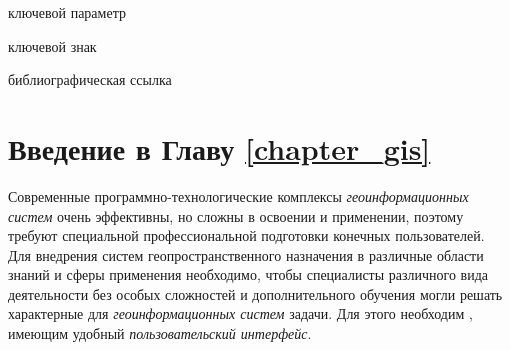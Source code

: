 \begin{SCn}
\begin{scnrelfromlist}{ключевой параметр}
\end{scnrelfromlist}

\begin{scnrelfromlist}{ключевой знак}
\end{scnrelfromlist}

\begin{scnrelfromlist}{библиографическая ссылка}
\end{scnrelfromlist}
\end{SCn}

\section*{Введение в Главу \ref{chapter_gis}}

Современные программно-технологические комплексы \textit{геоинформационных систем} очень эффективны, но сложны в освоении и применении, поэтому требуют специальной профессиональной подготовки конечных пользователей. Для внедрения систем геопространственного назначения в различные области знаний и сферы применения необходимо, чтобы специалисты различного вида деятельности без особых сложностей и дополнительного обучения могли решать характерные для \textit{геоинформационных систем} задачи. Для этого необходим , имеющим удобный \textit{пользовательский интерфейс}.

